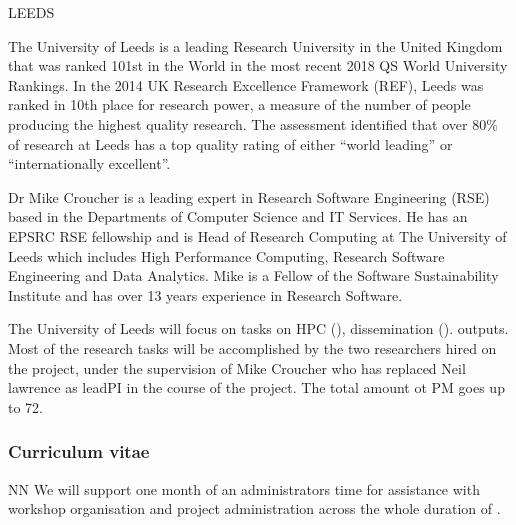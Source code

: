 \begin{sitedescription}{LEEDS}



The University of Leeds is a leading Research University in the
United Kingdom that was ranked 101st in the World in the most recent
2018 QS World University Rankings. In the 2014 UK Research Excellence Framework (REF),
Leeds was ranked in 10th place for research power, a measure of the number of people producing the highest quality research.
The assessment identified that over 80\% of research at Leeds has a top quality rating of either “world leading” or “internationally excellent”.

Dr Mike Croucher is a leading expert in Research Software Engineering (RSE) based in the Departments of Computer Science and IT Services.
He has an EPSRC RSE fellowship and is Head of Research Computing at The University of Leeds which includes High Performance Computing, Research Software Engineering and Data Analytics.
Mike is a Fellow of the Software Sustainability Institute and has over 13 years experience in Research Software.

The University of Leeds will focus on tasks on HPC (),
dissemination ().
\TheProject outputs. Most of the research tasks will be accomplished by the two researchers hired on the project, under the supervision of Mike Croucher who has replaced Neil lawrence as leadPI in the course of the project. The total amount ot PM goes up to 72.

\subsubsection*{Curriculum vitae}


%

\begin{participant}[type=res,PM=1]{NN}
  We will support one month of an administrators time for assistance
  with workshop organisation and project administration across the
  whole duration of \TheProject.
\end{participant}


%

\end{sitedescription}


